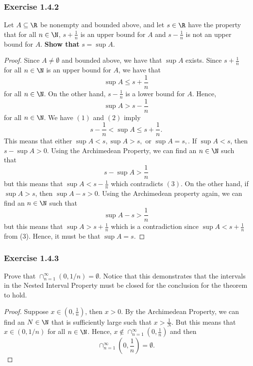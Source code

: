 \subsubsection{Exercise 1.4.2} 
    Let \( A \subseteq \R \) be nonempty and bounded above, and let \( s \in \R \) have the property that for all \( n \in \N \), \( s + \frac{1}{n} \) is an upper bound for \( A \) and \( s - \frac{1}{n} \) is not an upper bound for \( A \). \textbf{Show that } \( s = \sup A \).
        
    
    \begin{proof}
        Since \( A \neq \emptyset \) and bounded above, we have that \( \sup A \) exists. Since \( s + \frac{1}{n} \) for all \( n \in \N \) is an upper bound for \( A \), we have that 
        \[ \sup A \leq s + \frac{1}{n} \tag{1} \]
        for all \( n \in \N \). On the other hand, \( s - \frac{1}{n} \) is a lower bound for \( A \). Hence, 
        \[ \sup A > s - \frac{1}{n} \tag{2} \]
        for all \( n \in \N \). We have \( (1) \) and \( (2) \) imply 
        \[ s - \frac{1}{n} < \sup A \leq s + \frac{1}{n}. \tag{3} \]
        This means that either \( \sup A < s, \sup A > s, \) or \( \sup A = s, \). 
        If \( \sup A < s  \), then \( s - \sup A > 0 \). Using the Archimedean Property, we can find an \( n \in \N \) such that 
        \[ s - \sup A > \frac{1}{n}\]
        but this means that \( \sup  A < s - \frac{ 1}{n}\) which contradicts \( (3) \). On the other hand, if \( \sup A > s \), then \( \sup A - s > 0 \). Using the Archimedean property again, we can find an \( n \in \N \) such that 
        \[ \sup A - s > \frac{1}{n} \]
        but this means that \( \sup A > s + \frac{1}{n} \) which is a contradiction since \( \sup A < s + \frac{1}{n} \) from (3). Hence, it must be that \( \sup A = s \). 
    \end{proof}
    
\subsubsection{Exercise 1.4.3}
    Prove that \( \cap_{n=1}^{\infty} (0,1/n) = \emptyset \). Notice that this demonstrates that the intervals in the Nested Interval Property must be closed for the conclusion for the theorem to hold. 
    \begin{proof}
        Suppose \( x \in (0,\frac{1}{n}) \), then \( x > 0 \). By the Archimedean Property, we can find an \( N \in \N \) that is sufficiently large such that \( x > \frac{1}{N} \). But this means that \( x \in (0, 1/n )\) for all \( n \in \N  \). Hence, \( x \not\in \cap_{n=1}^{\infty} (0,\frac{1}{n})\) and then 
        \[ \cap_{n=1}^{\infty} (0,\frac{1}{n}) = \emptyset.\]
    \end{proof}
    
